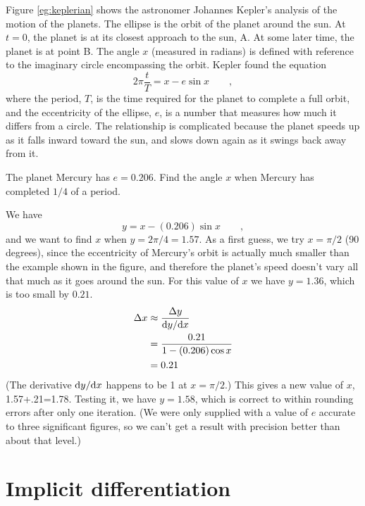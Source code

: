 
\begin{eg}\label{eg:keplerian}
\egquestion Figure \ref{eg:keplerian} shows the astronomer Johannes Kepler's analysis
of the motion of the planets. The ellipse is the orbit of the planet around
the sun. At $t=0$, the planet is at its closest approach to the sun, A. At some
later time, the planet is at point B. The angle $x$ (measured in radians) is defined with reference
to the imaginary circle encompassing the orbit. Kepler found the equation
\begin{equation*}
  2\pi \frac{t}{T} = x-e\sin x \qquad ,
\end{equation*}
where the period, $T$, is the time required for the planet to complete a full orbit, and
the eccentricity of the ellipse, $e$, is a number that measures how much it
differs from a circle. The relationship is complicated because the planet
speeds up as it falls inward toward the sun, and slows down again as it swings
back away from it.

The planet Mercury has $e=0.206$. Find the angle $x$
when Mercury has completed $1/4$ of a period.

\eganswer We have
\begin{equation*}
  y = x-(0.206)\sin x \qquad ,
\end{equation*}
and we want to find $x$ when $y=2\pi/4=1.57$. As a first guess, we try $x=\pi/2$ (90 degrees), since the eccentricity of Mercury's
orbit is actually much smaller than the example shown in the figure, and
therefore the planet's speed doesn't vary all that much as it goes around the sun.
For this value of $x$ we have $y=1.36$, which is too small by $0.21$.
\begin{align*}
  \Delta x &\approx \frac{\Delta y}{\textup{d} y/\textup{d} x} \\
           &= \frac{0.21}{1-(0.206)\cos x} \\
           &= 0.21
\end{align*}
(The derivative $\textup{d} y/\textup{d} x$ happens to be 1 at $x=\pi/2$.) This gives a new value of $x$, 1.57+.21=1.78.
Testing it, we have $y=1.58$, which is correct to within rounding errors after only one iteration.
(We were only supplied with a value of $e$ accurate to three significant figures, so we can't get a result
with precision better than about that level.)
\end{eg}

\section{Implicit differentiation}

